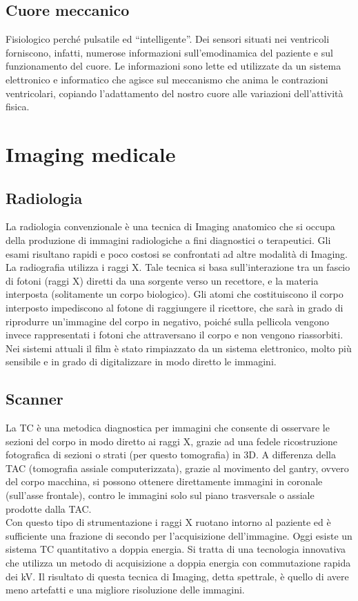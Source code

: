\documentclass[a4paper]{article}
\begin{document}
\subsection{Cuore meccanico}
Fisiologico perché pulsatile ed “intelligente”. Dei sensori situati nei 
ventricoli forniscono, infatti, numerose informazioni sull’emodinamica del 
paziente e sul funzionamento del cuore. Le informazioni sono lette ed 
utilizzate da un sistema elettronico e informatico che agisce sul meccanismo 
che anima le contrazioni ventricolari, copiando l’adattamento del nostro 
cuore alle variazioni dell’attività fisica.

\section{Imaging medicale}
\subsection{Radiologia}
La radiologia convenzionale è una tecnica di Imaging anatomico che si occupa 
della produzione di immagini radiologiche a fini diagnostici o terapeutici.
Gli esami risultano rapidi e poco costosi se confrontati ad altre modalità di 
Imaging. \\
La radiografia utilizza i raggi X. Tale tecnica si basa sull’interazione tra 
un fascio di fotoni (raggi X) diretti da una sorgente verso un recettore, e 
la materia interposta (solitamente un corpo biologico). Gli atomi che
costituiscono il corpo interposto impediscono al fotone di raggiungere il 
ricettore, che sarà in grado di riprodurre un’immagine del corpo in 
negativo, poiché sulla pellicola vengono invece rappresentati i fotoni che
attraversano il corpo e non vengono riassorbiti. \\
Nei sistemi attuali il film è stato rimpiazzato da un sistema elettronico, 
molto più sensibile e in grado di digitalizzare in modo diretto le immagini.

\subsection{Scanner}
La TC è una metodica diagnostica per immagini che consente di osservare le 
sezioni del corpo in modo diretto ai raggi X, grazie ad una fedele 
ricostruzione fotografica di sezioni o strati (per questo tomografia) in
3D. A differenza della TAC (tomografia assiale computerizzata), grazie al 
movimento del gantry, ovvero del corpo macchina, si possono ottenere 
direttamente immagini in coronale (sull’asse frontale), contro le
immagini solo sul piano trasversale o assiale prodotte dalla TAC. \\
Con questo tipo di strumentazione i raggi X ruotano intorno al paziente ed 
è sufficiente una frazione di secondo per l’acquisizione dell’immagine.
Oggi esiste un sistema TC quantitativo a doppia energia. Si tratta di una 
tecnologia innovativa che utilizza un metodo di acquisizione a doppia 
energia con commutazione rapida dei kV. Il risultato di questa tecnica di 
Imaging, detta spettrale, è quello di avere meno artefatti e una migliore 
risoluzione delle immagini.
\end{document}

